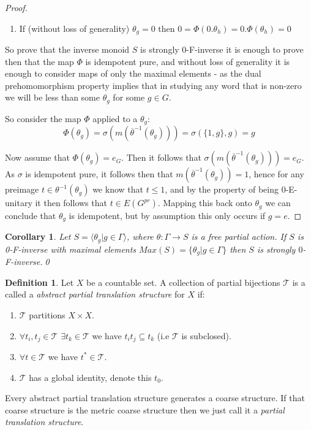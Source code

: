 \documentclass[11pt,a4paper]{amsart}
\theoremstyle{plain}
\newtheorem{corollary}[theorem]{Corollary}%
\theoremstyle{definition}%
\newtheorem{definition}[theorem]{Definition}%
\theoremstyle{remark}%
\begin{document}
\begin{proof}
\begin{enumerate}
\item If (without loss of generality) $\theta_{g}=0$ then $0=\Phi(0.\theta_{h})= 0.\Phi(\theta_{h})=0$
\end{enumerate}
So prove that the inverse monoid $S$ is strongly 0-F-inverse it is enough to prove then that the map $\Phi$ is idempotent pure, and without loss of generality it is enough to consider maps of only the maximal elements - as the dual prehomomorphism property implies that in studying any word that is non-zero we will be less than some $\theta_{g}$ for some $g \in G$.

So consider the map $\Phi$ applied to a $\theta_{g}$:
\begin{equation*}
\Phi(\theta_{g})=\sigma ( m(\overline{\theta}^{-1}(\theta_{g}))) = \sigma ( \lbrace 1,g \rbrace, g)= g
\end{equation*}

Now assume that $\Phi(\theta_{g}) = e_{G}$. Then it follows that $\sigma (m (\overline{\theta}^{-1}(\theta_{g})))=e_{G}$. As $\sigma$ is idempotent pure, it follows then that $m(\overline{\theta}^{-1}(\theta_{g}))=1$, hence for any preimage $t\in \theta^{-1}(\theta_{g})$ we know that $t \leq 1$, and by the property of being 0-E-unitary it then follows that $t \in E(G^{pr})$. Mapping this back onto $\theta_{g}$ we can conclude that $\theta_{g}$ is idempotent, but by assumption this only occurs if $g = e$.\end{proof}

\begin{corollary}
Let $S = \langle \theta_{g} | g \in \Gamma \rangle$, where $\theta: \Gamma \rightarrow S$ is a free partial action. If $S$ is 0-F-inverse with maximal elements $Max(S) = \lbrace \theta_{g} | g \in \Gamma \rbrace$ then $S$ is strongly $0$-F-inverse.\qed
\end{corollary}

\begin{definition}\label{Def:PTS}
Let $X$ be a countable set. A collection of partial bijections $\mathcal{T}$ is a called a \textit{abstract partial translation structure} for $X$ if:
\begin{enumerate}
\item $\mathcal{T}$ partitions $X\times X$.
\item $\forall t_{i}, t_{j} \in \mathcal{T}$ $\exists t_{k} \in \mathcal{T}$ we have $t_{i}t_{j} \subseteq t_{k}$ (i.e $\mathcal{T}$ is subclosed).
\item $\forall t \in \mathcal{T}$ we have $t^{*} \in \mathcal{T}$.
\item $\mathcal{T}$ has a global identity, denote this $t_{0}$.
\end{enumerate}
\end{definition}
Every abstract partial translation structure generates a coarse structure. If that coarse structure is the metric coarse structure then we just call it a \textit{partial translation structure}. 
\end{document}
